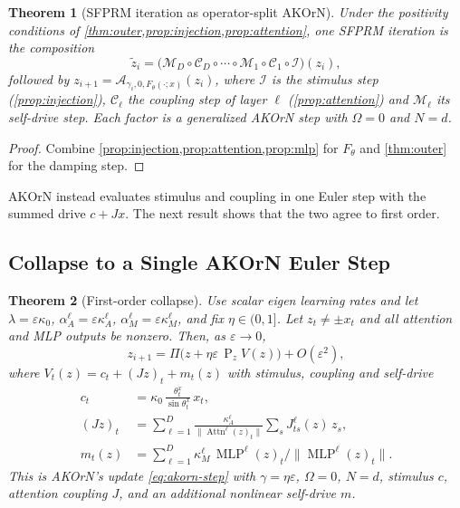 \documentclass{article}
\theoremstyle{plain}
\newtheorem{theorem}{Theorem}[section]
\theoremstyle{definition}
\theoremstyle{remark}
\newcommand{\norm}[1]{\lVert #1\rVert}
\newcommand{\Proj}{\operatorname{P}}
\newcommand{\Ret}{\Pi}
\newcommand{\Attn}{\operatorname{Attn}}
\newcommand{\MLP}{\operatorname{MLP}}
\begin{document}
\begin{theorem}[SFPRM iteration as operator-split AKOrN]
\label{thm:splitting}
Under the positivity conditions of \cref{thm:outer,prop:injection,prop:attention}, one SFPRM
iteration is the composition
\begin{equation}
  \tilde z_i = \big(\mathcal M_D\circ\mathcal C_D\circ\cdots\circ\mathcal M_1\circ\mathcal C_1\circ\mathcal I\big)(z_i),
\end{equation}
followed by $z_{i+1}=\mathcal A_{\gamma_i,0,F_\theta(\cdot;x)}(z_i)$, where $\mathcal I$ is the
stimulus step (\cref{prop:injection}), $\mathcal C_\ell$ the coupling step of layer $\ell$
(\cref{prop:attention}) and $\mathcal M_\ell$ its self-drive step. Each factor is a generalized AKOrN
step with $\Omega=0$ and $N=d$.
\end{theorem}
\begin{proof}
Combine \cref{prop:injection,prop:attention,prop:mlp} for $F_\theta$ and \cref{thm:outer} for the
damping step.
\end{proof}

AKOrN instead evaluates stimulus and coupling in one Euler step with the summed drive $c+Jx$. The
next result shows that the two agree to first order.

\subsection{Collapse to a Single AKOrN Euler Step}
\label{sec:collapse}

\begin{theorem}[First-order collapse]
\label{thm:trotter}
Use scalar eigen learning rates and let $\lambda=\varepsilon\kappa_0$,
$\alpha^\ell_A=\varepsilon\kappa^\ell_A$, $\alpha^\ell_M=\varepsilon\kappa^\ell_M$, and fix
$\eta\in(0,1]$. Let $z_t\neq\pm x_t$ and all attention and MLP outputs be nonzero. Then, as
$\varepsilon\to0$,
\begin{equation}
  z_{i+1} = \Ret\big(z + \eta\varepsilon\,\Proj_z V(z)\big) + O(\varepsilon^2),
\end{equation}
where $V_t(z)=c_t+(Jz)_t+m_t(z)$ with stimulus, coupling and self-drive
\begin{align}
  c_t &= \kappa_0\,\tfrac{\theta^x_t}{\sin\theta^x_t}\,x_t,\\
  (Jz)_t &= \textstyle\sum_{\ell=1}^D \frac{\kappa^\ell_A}{\norm{\Attn^\ell(z)_t}}\sum_s J^\ell_{ts}(z)\,z_s,\\
  m_t(z) &= \textstyle\sum_{\ell=1}^D \kappa^\ell_M\,\MLP^\ell(z)_t/\norm{\MLP^\ell(z)_t}.
\end{align}
This is AKOrN's update \eqref{eq:akorn-step} with $\gamma=\eta\varepsilon$, $\Omega=0$, $N=d$,
stimulus $c$, attention coupling $J$, and an additional nonlinear self-drive $m$.
\end{theorem}
\end{document}
